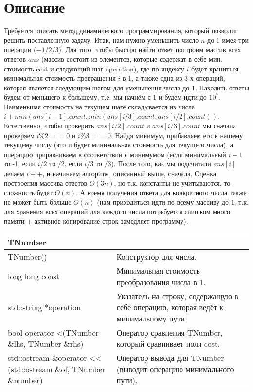 \section{Описание}
Требуется описать метод динамического программирования, который позволит решить поставленную задачу. Итак, нам нужно
уменьшить число $n$ до 1 имея три операции ($-1 /2 /3$). Для того, чтобы быстро найти ответ построим массив всех ответов $ans$
(массив состоит из элементов, которые содержат в себе мин. стоимость cost и следующий шаг operation), где по индексу $i$ будет 
храниться минимальная стоимость превращения $i$ в 1, а также одна из 3-х операций, которая является
следующим шагом для уменьшения числа до 1. Находить ответы будем от меньшего к большему, т.е. мы начнём с 1 и будем идти до $10^7$.
Наименьшая стоимость на текущем шаге складывается из числа $i + min(ans[i-1].count, min(ans[i/3].count, ans[i/2].count))$. Естественно, 
чтобы проверить $ans[i/2].count$ и $ans[i/3].count$ мы сначала проверяем $i\%2==0$ и $i\%3==0$. Найдя минимум, прибавляем его к нашему
текущему числу (это и будет минимальная стоимость для текущего числа), а операцию приравниваем в соответствии с минимумом (если минимальный
$i-1$ то -1, если $i/2$ то /2, если $i/3$ то /3). После того, как мы подсчитали $ans[i]$ делаем $i++$, и начинаем алгоритм, описанный выше,
сначала. Оценка построения массива ответов $O(3n)$, но т.к. константы не учитываются, то сложность будет $O(n)$. А время получения ответа для
конкретного числа также не может быть больше $O(n)$ (нам приходиться идти по всему массиву до 1, т.к. для хранения всех операций для каждого числа
потребуется слишком много памяти + активное копирование строк замедляет программу).
\pagebreak

\begin{longtable}{|p{7.5cm}|p{7.5cm}|}
    \hline
    \rowcolor{lightgray}
    \multicolumn{2}{|c|} {TNumber}\\
    \hline
    TNumber()&Конструктор для числа.\\
    \hline
    long long const&Минимальная стоимость преобразования числа в 1.\\
    \hline
    std::string *operation&Указатель на строку, содержащую в себе операцию, которая ведёт к минимальному пути.\\
    \hline
    bool operator <(TNumber \&lhs, TNumber \&rhs)&Оператор сравнения TNumber, который сравнивает поля cost.\\
    \hline
    std::ostream \&operator << (std::ostream \&of, TNumber \&number)&Оператор вывода для TNumber (выводит операцию минимального пути).\\
    \hline
\end{longtable}

